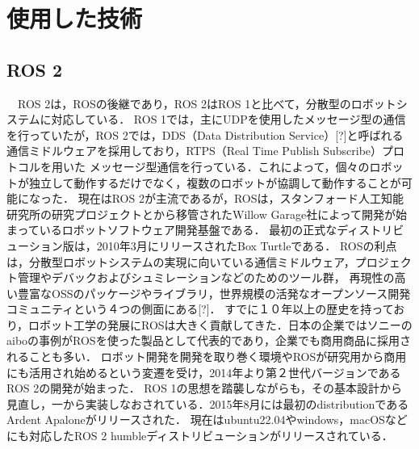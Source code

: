 \chapter{使用した技術}
\label{sec:usage}
\section{ROS 2}
　ROS 2は，ROSの後継であり，ROS 2はROS 1と比べて，分散型のロボットシステムに対応している．
ROS 1では，主にUDPを使用したメッセージ型の通信を行っていたが，ROS 2では，DDS（Data Distribution Service）[?]と呼ばれる通信ミドルウェアを採用しており，RTPS（Real Time Publish Subscribe）プロトコルを用いた
メッセージ型通信を行っている．これによって，個々のロボットが独立して動作するだけでなく，複数のロボットが協調して動作することが可能になった．
現在はROS 2が主流であるが，ROSは，スタンフォード人工知能研究所の研究プロジェクトとから移管されたWillow Garage社によって開発が始まっているロボットソフトウェア開発基盤である．
最初の正式なディストリビューション版は，2010年3月にリリースされたBox Turtleである．
ROSの利点は，分散型ロボットシステムの実現に向いている通信ミドルウェア，プロジェクト管理やデバックおよびシュミレーションなどのためのツール群，
再現性の高い豊富なOSSのパッケージやライブラリ，世界規模の活発なオープンソース開発コミュニティという４つの側面にある[?]．
すでに１０年以上の歴史を持っており，ロボット工学の発展にROSは大きく貢献してきた．日本の企業ではソニーのaiboの事例がROSを使った製品として代表的であり，企業でも商用商品に採用されることも多い．
ロボット開発を開発を取り巻く環境やROSが研究用から商用にも活用され始めるという変遷を受け，2014年より第２世代バージョンであるROS 2の開発が始まった．
ROS 1の思想を踏襲しながらも，その基本設計から見直し，一から実装しなおされている．2015年8月には最初のdistributionであるArdent Apaloneがリリースされた．
現在はubuntu22.04やwindows，macOSなどにも対応したROS 2 humbleディストリビューションがリリースされている．

